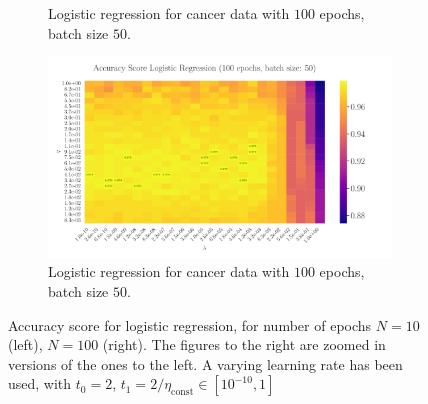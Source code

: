 \documentclass[%
reprint,s
amsmath,amssymb,
aps,
]{revtex4-2}
\begin{document}
\begin{figure}
\begin{subfigure}{0.41\textwidth}
		\caption{Logistic regression for cancer data with \(100\) epochs, batch size \(50\).}
		\label{fig:LogReg25x25_epoch100_bacthS50}
	\end{subfigure}
	\hfill
	\begin{subfigure}{0.41\textwidth}
		\includegraphics[width=\textwidth]{Figures/LogReg25x25_epoch100_batchS50_zoomed.pdf}
		\caption{Logistic regression for cancer data with \(100\) epochs, batch size \(50\).}
		\label{fig:LogReg25x25_epoch100_bacthS50_zoomed}
	\end{subfigure}
	\caption{Accuracy score for logistic regression, for number of epochs \(N=10\) (left), \(N=100\) (right). The figures to the right are zoomed in versions of the ones to the left. A varying learning rate has been used, with \(t_0=2\), \(t_{1} = 2/\eta_{\text{const}} \in [10^{-10}, 1]\)}
	\label{fig:LogReg}
\end{figure}
\end{document}
